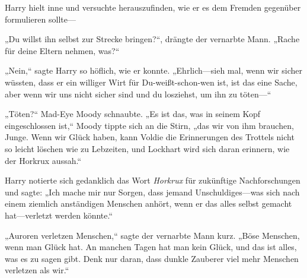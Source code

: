 Harry hielt inne und versuchte herauszufinden, wie er es dem Fremden gegenüber formulieren sollte—

„Du willst ihn selbst zur Strecke bringen?“, drängte der vernarbte Mann. „Rache für deine Eltern nehmen, was?“

„Nein,“ sagte Harry so höflich, wie er konnte. „Ehrlich—sieh mal, wenn wir sicher wüssten, dass er ein williger Wirt für Du-weißt-schon-wen ist, ist das eine Sache, aber wenn wir uns nicht sicher sind und du losziehst, um ihn zu töten—“

„Töten?“ Mad-Eye Moody schnaubte. „Es ist das, was in seinem Kopf eingeschlossen ist,“ Moody tippte sich an die Stirn, „das wir von ihm brauchen, Junge. Wenn wir Glück haben, kann Voldie die Erinnerungen des Trottels nicht so leicht löschen wie zu Lebzeiten, und Lockhart wird sich daran erinnern, wie der Horkrux aussah.“

Harry notierte sich gedanklich das Wort \emph{Horkrux} für zukünftige Nachforschungen und sagte: „Ich mache mir nur Sorgen, dass jemand Unschuldiges—was sich nach einem ziemlich anständigen Menschen anhört, wenn er das alles selbst gemacht hat—verletzt werden könnte.“

„Auroren verletzen Menschen,“ sagte der vernarbte Mann kurz. „Böse Menschen, wenn man Glück hat. An manchen Tagen hat man kein Glück, und das ist alles, was es zu sagen gibt. Denk nur daran, dass dunkle Zauberer viel mehr Menschen verletzen als wir.“

